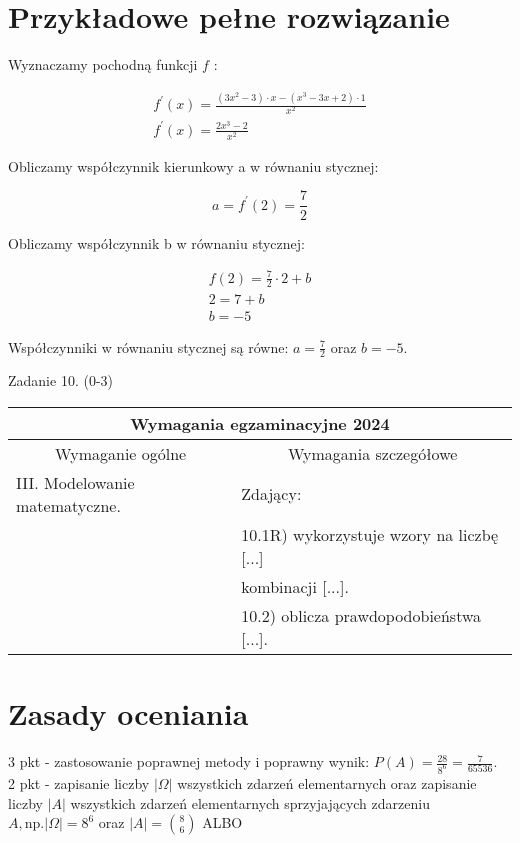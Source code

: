 \documentclass[10pt]{article}
\begin{document}
\section*{Przykładowe pełne rozwiązanie}
Wyznaczamy pochodną funkcji $f$ :

$$
\begin{gathered}
f^{\prime}(x)=\frac{\left(3 x^{2}-3\right) \cdot x-\left(x^{3}-3 x+2\right) \cdot 1}{x^{2}} \\
f^{\prime}(x)=\frac{2 x^{3}-2}{x^{2}}
\end{gathered}
$$

Obliczamy współczynnik kierunkowy a w równaniu stycznej:

$$
a=f^{\prime}(2)=\frac{7}{2}
$$

Obliczamy współczynnik b w równaniu stycznej:

$$
\begin{gathered}
f(2)=\frac{7}{2} \cdot 2+b \\
2=7+b \\
b=-5
\end{gathered}
$$

Współczynniki w równaniu stycznej są równe: $a=\frac{7}{2}$ oraz $b=-5$.

Zadanie 10. (0-3)

\begin{center}
\begin{tabular}{|l|l|}
\hline
\multicolumn{2}{|c|}{Wymagania egzaminacyjne 2024} \\
\hline
\multicolumn{1}{|c|}{Wymaganie ogólne} & \multicolumn{1}{|c|}{Wymagania szczegółowe} \\
\hline
III. Modelowanie matematyczne. & Zdający: \\
 & 10.1R) wykorzystuje wzory na liczbę [...] \\
 & kombinacji [...]. \\
 & 10.2) oblicza prawdopodobieństwa [...]. \\
\hline
\end{tabular}
\end{center}

\section*{Zasady oceniania}
3 pkt - zastosowanie poprawnej metody i poprawny wynik: $P(A)=\frac{28}{8^{6}}=\frac{7}{65536}$.\\
2 pkt - zapisanie liczby $|\Omega|$ wszystkich zdarzeń elementarnych oraz zapisanie liczby $|A|$ wszystkich zdarzeń elementarnych sprzyjających zdarzeniu $A, \mathrm{np} .|\Omega|=8^{6}$ oraz $|A|=\binom{8}{6}$ ALBO
\end{document}
